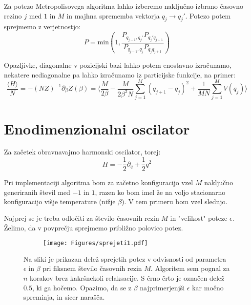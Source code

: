 \documentclass{article}
\begin{document}
Za potezo Metropolisovega algoritma lahko izberemo naključno izbrano časovno rezino $j$ med $1$ in $M$ in majhna sprememba vektorja $q_j \to q_j'$.
Potezo potem sprejmemo z  verjetnostjo:
\begin{equation*}
P = \mathrm{min} \left(1, \frac{P_{q_{j-1}, q_j'} P_{q_j' q_{j+1}}}{P_{q_{j-1}, q_j} P_{q_j q_{j+1}}} \right)
\end{equation*}

Opazljivke, diagonalne v pozicijski bazi lahko potem enostavno izračunamo, nekatere nediagonalne pa lahko izračunamo iz particijske funkcije, na primer:
\begin{equation*}
\frac{\langle H \rangle}{N} = -(NZ)^{-1} \partial_\beta Z(\beta) = \langle \frac{M}{2\beta} - \frac{M}{2\beta^2 N} \sum_{j=1}^M (q_{j+1} - q_j)^2 + \frac{1}{MN} \sum_{j=1}^M V(q_j) \rangle
\end{equation*}

\section*{Enodimenzionalni oscilator}

Za začetek obravnavajmo harmonski oscilator, torej:
\begin{equation*}
H = -\frac{1}{2} \partial_q + \frac{1}{2} q^2
\end{equation*}

Pri implementaciji algoritma bom za začetno konfiguracijo vzel $M$ naključno generiranih števil med $-1$ in $1$, razen ko bom imel že na voljo stacionarno konfiguracijo višje temperature (nižje $\beta$). V tem primeru bom vzel slednjo.

Najprej se je treba odločiti za število časovnih rezin $M$ in "velikost" poteze $\epsilon$. Želimo, da v povprečju sprejmemo približno polovico potez.

\begin{figure}[H]
\centering
\begin{subfigure}{\textwidth}
\texttt{[image: Figures/sprejeti1.pdf]}
\end{subfigure}
\caption*{Na sliki je prikazan delež sprejetih potez v odvisnosti od parametra $\epsilon$ in $\beta$ pri fiksnem število časovnih rezin $M$. Algoritem sem pognal za $n$ korakov brez kakršnekoli relaksacije. S črno črto je označen delež $0.5$, ki ga hočemo. Opazimo, da se z $\beta$  najprimerjenjši $\epsilon$ kar močno spreminja, in sicer narašča. }
\end{figure}
\end{document}
